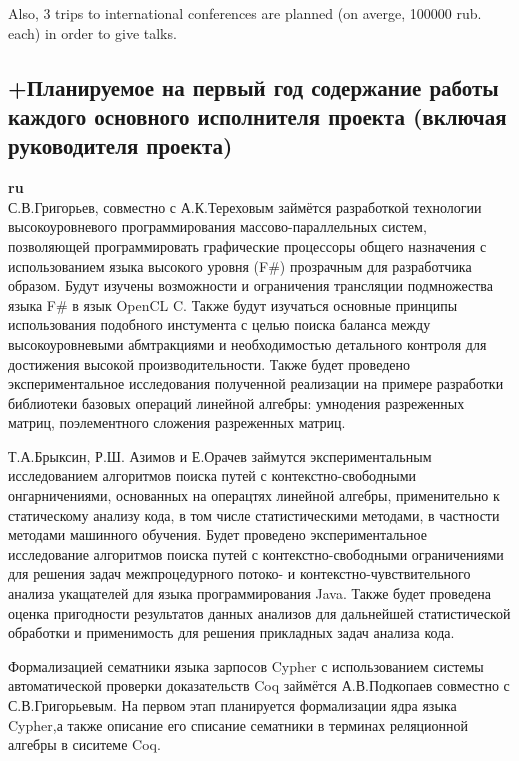 \documentclass[12pt]{article}  %
\theoremstyle{remark}
\begin{document}
Also, 3 trips to international conferences are planned (on averge, 100000 rub. each) in order to give talks.



\subsection{+Планируемое на первый год содержание работы каждого основного исполнителя проекта (включая руководителя проекта)}

\textbf{ru}\\

С.В.Григорьев, совместно с А.К.Тереховым займётся разработкой технологии высокоуровневого программирования массово-параллельных систем, позволяющей программировать графические процессоры общего назначения с использованием языка высокого уровня (F\#) прозрачным для разработчика образом. Будут изучены возможности и ограничения трансляции подмножества языка F\# в язык OpenCL C. Также будут изучаться основные принципы использования подобного инстумента с целью поиска баланса между высокоуровневыми абмтракциями и необходимостью детального контроля для достижения высокой производительности. Также будет проведено экспериментальное исследования полученной реализации на примере разработки библиотеки базовых операций линейной алгебры: умнодения разреженных матриц, поэлементного сложения разреженных матриц.

Т.А.Брыксин, Р.Ш. Азимов и Е.Орачев займутся экспериментальным исследованием алгоритмов поиска путей с контекстно-свободными онгарничениями, основанных на операцтях линейной алгебры, применительно к статическому анализу кода, в том числе статистическими методами, в частности методами машинного обучения. Будет проведено экспериментальное исследование алгоритмов поиска путей с контекстно-свободными ограничениями для решения задач межпроцедурного потоко- и контекстно-чувствительного анализа укащателей для языка программирования Java. Также будет проведена оценка пригодности результатов данных анализов для дальнейшей статистической обработки и применимость для решения прикладных задач анализа кода.

Формализацией сематники языка зарпосов Cypher с использованием системы автоматической проверки доказательств Coq займётся А.В.Подкопаев совместно с С.В.Григорьевым. На первом этап планируется формализации ядра языка Cypher,а также описание его списание сематники в терминах реляционной алгебры в сиситеме Coq.
\end{document}
